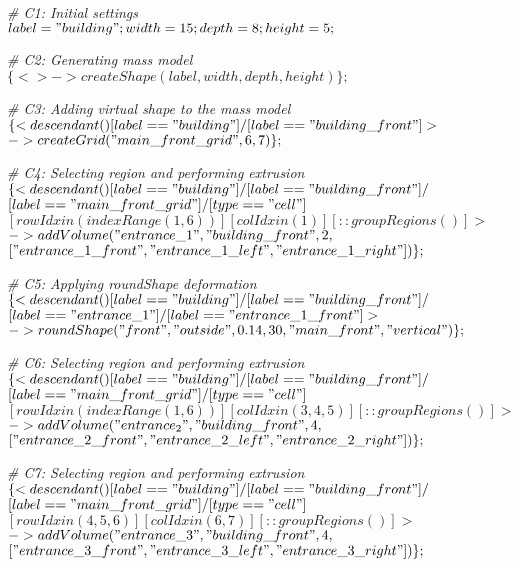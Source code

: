 \noindent \textit{\# C1: Initial settings} \\
$label = "building"; width = 15; depth = 8; height = 5;$

\noindent \textit{\# C2: Generating mass model} \\
$\{<> -> createShape(label, width, depth, height)\};$

\noindent \textit{\# C3: Adding virtual shape to the mass model} \\
$\{< descendant() [label=="building"] / [label=="building\_front"] >$ \\
$-> createGrid("main\_front\_grid", 6, 7)\};$

\noindent \textit{\# C4: Selecting region and performing extrusion} \\
$\{< descendant() [label=="building"] / [label=="building\_front"] / $ \\
$[label=="main\_front\_grid"] / [type=="cell"]$ \\
$[rowIdx in (indexRange(1, 6))] [colIdx in (1)] [::groupRegions()] >$ \\
$-> addVolume("entrance\_1", "building\_front", 2,$ \\
$["entrance\_1\_front", "entrance\_1\_left", "entrance\_1\_right"])\};$

\noindent \textit{\# C5: Applying roundShape deformation} \\
$\{< descendant() [label=="building"] / [label=="building\_front"] / $\\
$[label=="entrance\_1"] / [label=="entrance\_1\_front"] > $\\
$-> roundShape("front", "outside", 0.14, 30, "main\_front", "vertical")\};$

\noindent \textit{\# C6: Selecting region and performing extrusion}\\
$\{< descendant() [label=="building"] / [label=="building\_front"] / $\\
$[label=="main\_front\_grid"] / [type=="cell"] $\\
$[rowIdx in (indexRange(1, 6))] [colIdx in (3, 4, 5)] [::groupRegions()] > $\\
$-> addVolume("entrance_2", "building\_front", 4, $\\
$["entrance\_2\_front", "entrance\_2\_left", "entrance\_2\_right"])\};$

\noindent \textit{\# C7: Selecting region and performing extrusion}\\
$\{< descendant() [label=="building"] / [label=="building\_front"] / $ \\
$[label=="main\_front\_grid"] / [type=="cell"] $\\
$[rowIdx in (4, 5, 6)] [colIdx in (6, 7)] [::groupRegions()] > $\\
$-> addVolume("entrance\_3", "building\_front", 4, $\\
$["entrance\_3\_front", "entrance\_3\_left", "entrance\_3\_right"])\};$

